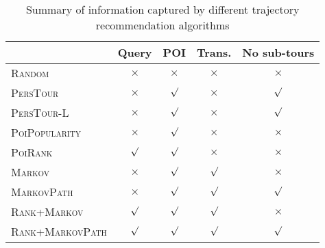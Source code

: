

\begin{table}[t]
\caption{Summary of information captured by different trajectory recommendation algorithms}
\label{tab:algsummary}
\centering
\setlength{\tabcolsep}{3pt} %
\begin{tabular}{l|*{4}{c}} \hline
                                & Query    & POI      & Trans.     & No sub-tours \\ \hline %
\textsc{Random}                 & $\times$ & $\times$ & $\times$   & $\times$     \\ %
\textsc{PersTour}\cite{ijcai15} & $\times$ & $\surd$  & $\times$   & $\surd$      \\ %
\textsc{PersTour-L}             & $\times$ & $\surd$  & $\times$   & $\surd$      \\ %
\textsc{PoiPopularity}          & $\times$ & $\surd$  & $\times$   & $\times$     \\ %
\textsc{PoiRank}                & $\surd$  & $\surd$  & $\times$   & $\times$     \\ %
\textsc{Markov}                 & $\times$ & $\surd$  & $\surd$    & $\times$     \\ %
\textsc{MarkovPath}             & $\times$ & $\surd$  & $\surd$    & $\surd$      \\ %
\textsc{Rank+Markov}            & $\surd$  & $\surd$  & $\surd$    & $\times$     \\ %
\textsc{Rank+MarkovPath}        & $\surd$  & $\surd$  & $\surd$    & $\surd$      \\ %
\hline
\end{tabular}\eqmoveup\eqmoveup
\end{table}
